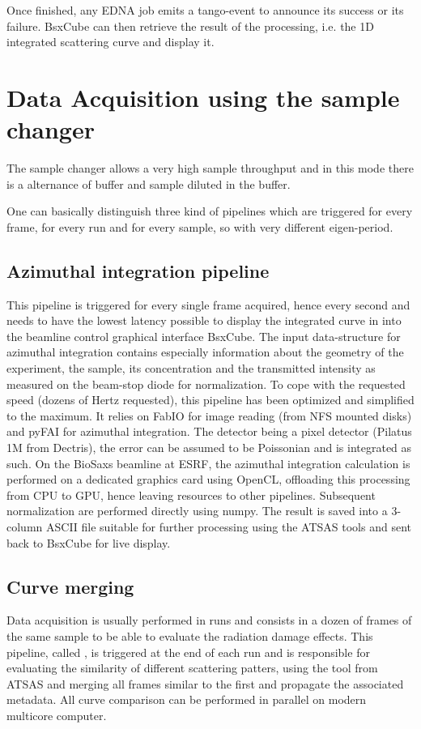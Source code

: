 \documentclass[preprint]{iucr}              %
\begin{document}
Once finished, any EDNA job emits a tango-event to announce its success or its
failure. BsxCube can then retrieve the result of the processing, i.e. the 1D
integrated scattering curve and display it. 

\section{Data Acquisition using the sample changer}

The sample changer allows a very high sample throughput and in this mode there
is a alternance of buffer and sample diluted in the buffer. 

One can basically distinguish three kind of pipelines which are triggered for
every frame, for every run and for every sample, so with very different
eigen-period.

\subsection{Azimuthal integration pipeline}

This pipeline is triggered for every single frame acquired, hence every second
and needs to have the lowest latency possible to display the integrated curve
in  into the beamline control graphical interface BsxCube.
The input data-structure for azimuthal integration contains especially
information about the geometry of the experiment, the sample, its concentration
and the transmitted intensity as measured on the beam-stop diode for
normalization.
To cope with the requested speed (dozens of Hertz requested), this pipeline
has been optimized and simplified to the maximum. 
It relies on FabIO\cite{fabio} for image reading (from NFS mounted disks) and
pyFAI\cite{pyFAI} for azimuthal integration. 
The detector being a pixel detector (Pilatus 1M from Dectris), the error can be
assumed to be Poissonian and is integrated as such. 
On the BioSaxs beamline at ESRF, the azimuthal integration calculation is
performed on a dedicated graphics card using OpenCL, offloading this processing from CPU to
GPU, hence leaving resources to other pipelines. 
Subsequent normalization are
performed directly using numpy\cite{numpy}.
The result is saved into a 3-column ASCII file suitable for further processing
using the ATSAS tools\cite{atsas} and sent back to BsxCube for live display. 

\subsection{Curve merging}
Data acquisition is usually performed in runs and consists in a dozen of frames
of the same sample to be able to evaluate the radiation damage effects.
This pipeline, called , is triggered at the end of each run
and is responsible for evaluating the similarity of different scattering
patters, using the  tool from ATSAS and merging all frames
similar to the first and propagate the associated metadata. All curve comparison
can be performed in parallel on modern multicore computer.
\end{document}
